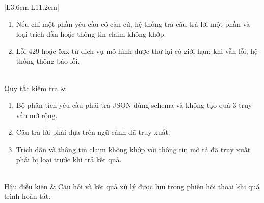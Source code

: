\documentclass[12pt,a4paper,oneside]{report}
\begin{document}
{\begin{longtable}{|L{3.6cm}|L{11.2cm}|}
\begin{enumerate}[leftmargin=*,nosep]
                            \item Nếu chỉ một phần yêu cầu có căn cứ, hệ thống trả câu trả lời một phần và loại trích dẫn hoặc thông tin claim không khớp.
                            \item Lỗi 429 hoặc 5xx từ dịch vụ mô hình được thử lại có giới hạn; khi vẫn lỗi, hệ thống thông báo lỗi.
                          \end{enumerate} \\
    \hline
    Quy tắc kiểm tra    & \begin{enumerate}[leftmargin=*,nosep]
                            \item Bộ phân tích yêu cầu phải trả JSON đúng schema và không tạo quá 3 truy vấn mở rộng.
                            \item Câu trả lời phải dựa trên ngữ cảnh đã truy xuất.
                            \item Trích dẫn và thông tin claim không khớp với thông tin mô tả đã truy xuất phải bị loại trước khi trả kết quả.
                          \end{enumerate}                                                                                                           \\
    \hline
    Hậu điều kiện       & Câu hỏi và kết quả xử lý được lưu trong phiên hội thoại khi quá trình hoàn tất.                                                                                                                                             \\
    \hline
  \end{longtable}
}
\end{document}
